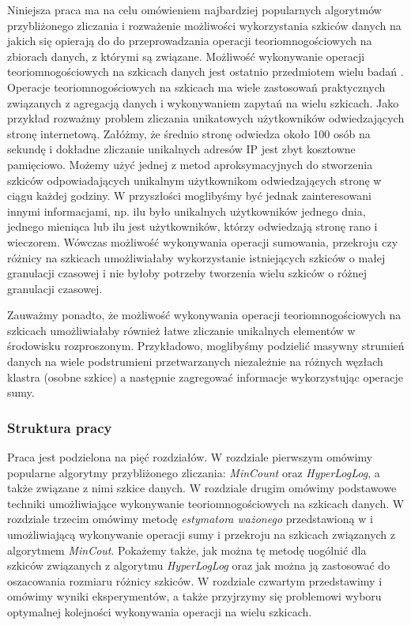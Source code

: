 Niniejsza praca ma na celu omówieniem najbardziej popularnych algorytmów przybliżonego zliczania i rozważenie możliwości wykorzystania szkiców danych
na jakich się opierają do do przeprowadzania operacji teoriomnogościowych na zbiorach danych, z którymi są związane.  Możliwość wykonywanie operacji teoriomnogościowych na szkicach danych jest ostatnio przedmiotem wielu badań .
Operacje teoriomnogościowych na szkicach ma wiele zastosowań praktycznych związanych z agregacją danych i  wykonywaniem  zapytań na wielu szkicach. Jako przykład rozważmy problem zliczania unikatowych użytkowników odwiedzających stronę internetową. Załóżmy, że średnio stronę odwiedza około 100 osób na sekundę i dokładne zliczanie unikalnych adresów IP jest zbyt kosztowne pamięciowo. Możemy użyć jednej z metod aproksymacyjnych do stworzenia szkiców odpowiadających unikalnym użytkownikom odwiedzających stronę  w ciągu każdej godziny. W przyszłości moglibyśmy być jednak zainteresowani innymi informacjami, np. ilu było
unikalnych użytkowników jednego dnia, jednego mieniąca
lub ilu jest użytkowników, którzy odwiedzają stronę rano i wieczorem.   
Wówczas możliwość wykonywania operacji sumowania, przekroju czy różnicy na szkicach umożliwiałaby wykorzystanie istniejących szkiców o małej granulacji czasowej i nie byłoby potrzeby tworzenia wielu szkiców o różnej granulacji czasowej. 

Zauważmy ponadto, że możliwość wykonywania operacji 
teoriomnogościowych na szkicach umożliwiałaby również
łatwe zliczanie unikalnych elementów w środowisku rozproszonym. Przykładowo, moglibyśmy podzielić masywny strumień danych na wiele podstrumieni przetwarzanych niezależnie na różnych węzłach klastra (osobne szkice)
a następnie zagregować informacje wykorzystując operacje sumy.

\subsubsection{Struktura pracy}
Praca jest podzielona na pięć rozdziałów. W rozdziale pierwszym omówimy popularne algorytmy przybliżonego zliczania: \textit{MinCount} oraz \textit{HyperLogLog}, a także związane z nimi szkice danych. 
W rozdziale drugim omówimy podstawowe techniki 
umożliwiające wykonywanie  teoriomnogościowych na szkicach danych. W rozdziale trzecim omówimy metodę \textit{estymatora ważonego} przedstawioną w \cite{ting} i umożliwiającą wykonywanie operacji sumy i przekroju na szkicach związanych z algorytmem \textit{MinCout}. Pokażemy także, jak można tę metodę uogólnić dla szkiców związanych z algorytmu \textit{HyperLogLog} oraz jak można ją zastosować do oszacowania rozmiaru różnicy szkiców. W rozdziale czwartym przedstawimy i omówimy wyniki eksperymentów, a także przyjrzymy się problemowi wyboru optymalnej kolejności wykonywania operacji na wielu szkicach. 